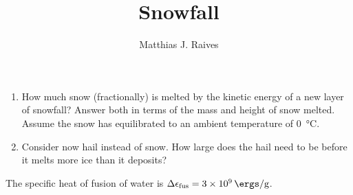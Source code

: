 \documentclass{article}
\title{Snowfall}
\author{Matthias J. Raives}
\begin{document}
    
    \maketitle{}
    
    \begin{enumerate}
    
        \item How much snow (fractionally) is melted by the kinetic energy of a new layer of snowfall?  Answer both in terms of the mass and height of snow melted.  Assume the snow has equilibrated to an ambient temperature of \SI{0}{\celsius}.
        
        
        \item Consider now hail instead of snow.  How large does the hail need to be before it melts more ice than it deposits?
    
    \end{enumerate}    
    
    The specific heat of fusion of water is $\Delta\epsilon_\mathrm{fus}=\SI{3e9}{\ergs\per\gram}$.
    
\end{document}
